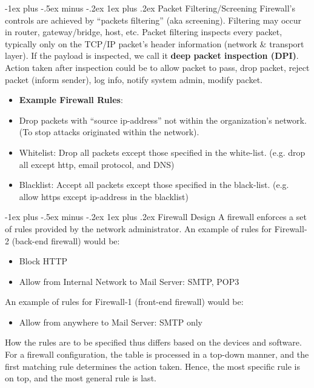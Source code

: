 \documentclass[10pt, landscape]{article}
\makeatletter
\renewcommand{\subsubsection}{\@startsection{subsubsection}{3}{0mm}%
                                {-1ex plus -.5ex minus -.2ex}%
                                {1ex plus .2ex}%
                                {\normalfont\small\bfseries}}
\makeatother
\begin{document}
\begin{multicols*}{3}
\subsubsection{Packet Filtering/Screening}
Firewall’s controls are achieved by “packets filtering” (aka screening). Filtering may occur in router, gateway/bridge, host, etc. Packet filtering inspects every packet, typically only on the TCP/IP packet’s header information (network \& transport layer). If the payload is inspected, we call it \textbf{deep packet inspection (DPI)}. Action taken after inspection could be to allow packet to pass, drop packet, reject packet (inform sender), log info, notify system admin, modify packet.

\begin{itemize}
\item \textbf{Example Firewall Rules}: 
\item Drop packets with “source ip-address” not within the organization’s network. (To 
stop attacks originated within the network).
\item Whitelist: Drop all packets except those specified in the white-list. (e.g. drop all except http, email 
protocol, and DNS)
\item Blacklist: Accept all packets except those specified in the black-list. (e.g. allow https except ip-address in 
the blacklist)
\end{itemize}

\subsubsection{Firewall Design}
A firewall enforces a set of rules provided by the network administrator. 
An example of rules for Firewall-2 (back-end firewall) would be:
\begin{itemize}
\item Block HTTP
\item Allow from Internal Network to Mail Server: SMTP, POP3
\end{itemize}
An example of rules for Firewall-1 (front-end firewall) would be:
\begin{itemize}
\item Allow from anywhere to Mail Server: SMTP only
\end{itemize}
How the rules are to be specified thus differs based on the devices and software. For a firewall configuration, the table is processed in a top-down manner, and the first matching rule determines the action taken. Hence, the most specific rule is on top, and the most general rule is last.



\end{multicols*}
\end{document}
